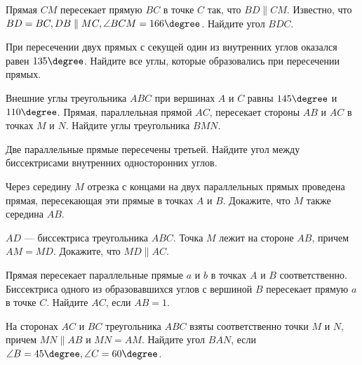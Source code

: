 \begin{homework}[number=1]
	\begin{listofex}
		
		
		\item Прямая \(CM\) пересекает прямую \(BC\) в точке \(C\) так, что \(BD \parallel CM\). Известно, что \(BD=BC, DB \parallel MC, \angle BCM = 166 \degree\). Найдите угол \( BDC \).
		\item При пересечении двух прямых с секущей один из внутренних углов оказался равен \(135\degree\). Найдите все углы, которые образовались при пересечении прямых.
		\item Внешние углы треугольника \(ABC\) при вершинах \(A\) и \(C\) равны \(145\degree\) и \(110\degree \). Прямая, параллельная прямой \(AC\), пересекает стороны \(AB\) и \(AC\) в точках \(M\) и \(N\). Найдите углы треугольника \(BMN\).
		\item Две параллельные прямые пересечены третьей. Найдите угол между биссектрисами внутренних односторонних углов.
	\end{listofex}
\end{homework}

\begin{class}[number=3]
	\begin{listofex}
		\item Через середину \(M\) отрезка с концами на двух параллельных прямых проведена прямая, пересекающая эти прямые в точках \(A\) и \(B\). Докажите, что \(M\) также середина \(AB\).
		\item \(AD\) --- биссектриса треугольника \(ABC\). Точка \(M\) лежит на стороне \(AB\), причем \(AM = MD\). Докажите, что \(MD \parallel AC\).
		\item Прямая пересекает параллельные прямые \(a\) и \(b\) в точках \(A\) и \(B\) соответственно. Биссектриса одного из образовавшихся углов с вершиной \(B\) пересекает прямую \(a\) в точке \(C\). Найдите \(AC\), если \(AB = 1\).
		\item На сторонах \(AC\) и \(BC\) треугольника \(ABC\) взяты соответственно точки \(M\) и \(N\), причем \(MN \parallel AB\) и \(MN = AM\). Найдите угол \(BAN\), если \( \angle B = 45 \degree, \angle C = 60 \degree  \).
		
	\end{listofex}
\end{class}

